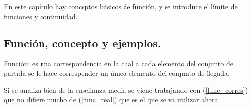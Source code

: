 \documentclass[10pt,twoside]{SelfArx} %
\begin{document}
En este capítulo hay conceptos básicos de función, y se introduce el  límite de funciones y continuidad.















\subsection{ Función, concepto y ejemplos.}


 

\begin{thm}\label{func_corres}
	 Función: es una correspondencia en la cual a cada elemento del conjunto de partida se le hace corresponder un único elemento del conjunto de llegada.\\
	 
\end{thm}
Si se analiza bien de la enseñanza media se viene trabajando con (\ref{func_corres}) que no difiere mucho de (\ref{func_real}) que es el que se va utilizar ahora.\\
\end{document}

